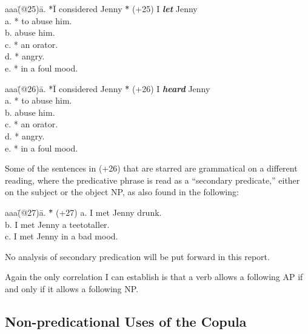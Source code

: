 \begin{tabbing}
aaa\=(@25)\= a. \= *\= I considered Jenny \= *\=        \kill
   \>(+25)\>    \>  \> I {\em \bf let} Jenny               \\
   \>     \> a. \>  \>                  \> *\> to abuse him. \\
   \>     \> b. \>  \>                  \>  \> abuse him. \\
   \>     \> c. \>  \>                  \> *\> an orator.    \\    
   \>     \> d. \>  \>                  \> *\> angry.    \\    
   \>     \> e. \>  \>                  \> *\> in a foul mood.
\end{tabbing}
\begin{tabbing}
aaa\=(@26)\= a. \= *\= I considered Jenny \= *\=        \kill
   \>(+26)\>    \>  \> I {\em \bf heard} Jenny               \\
   \>     \> a. \>  \>                  \> *\> to abuse him. \\
   \>     \> b. \>  \>                  \>  \> abuse him. \\
   \>     \> c. \>  \>                  \> *\> an orator.    \\    
   \>     \> d. \>  \>                  \> *\> angry.    \\    
   \>     \> e. \>  \>                  \> *\> in a foul mood.
\end{tabbing}
Some of the sentences in (+26) that are starred are grammatical on a
different reading, where the predicative phrase is read as a ``secondary
predicate,'' either on the subject or the object NP, as also found in
the following:
\begin{tabbing}
aaa\=(@27)\= a. \= *\= \kill
   \>(+27)\> a. \>  \> I met Jenny drunk. \\
   \>     \> b. \>  \> I met Jenny a teetotaller. \\
   \>     \> c. \>  \> I met Jenny in a bad mood. 
\end{tabbing}
No analysis of secondary predication will be put forward in this report.

Again the only correlation I can establish is that a verb allows a
following AP if and only if it allows a following NP.



\subsection{Non-predicational Uses of the Copula}


